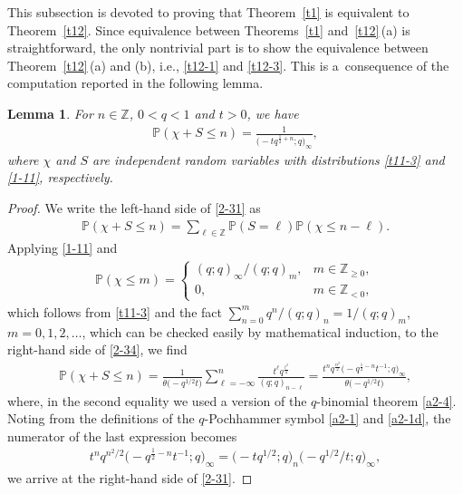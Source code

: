 \documentclass[pdftex]{sigma}
\numberwithin{equation}{section}
\newtheorem{Lemma}[Theorem]{Lemma}
\def\i{\infty}
\def\P{\mathbb{P}}
\def\Z{\mathbb{Z}}
\begin{document}
This subsection is devoted to proving that Theorem~\ref{t1} is equivalent to Theorem~\ref{t12}. Since equivalence between Theorems~\ref{t1} and~\ref{t12}\,(a) is straightforward, the only nontrivial part is to show the equivalence between Theorem~\ref{t12}\,(a) and (b), i.e., \eqref{t12-1} and \eqref{t12-3}. This is a~consequence of the computation reported in the following lemma.
\begin{Lemma}
\label{l27}
For $n\in\Z$, $0<q<1$ and
$t>0$, we have
 \begin{align}
\label{2-31}
 \P(\chi+S\le n)
 =
 \frac{1}{\bigl(-t q^{\frac12+n};q\bigr)_{\i}},
\end{align}
 where $\chi$ and $S$ are independent random variables with distributions
 \eqref{t11-3} and \eqref{1-11}, respectively.
\end{Lemma}
 \begin{proof}
 We write the left-hand side of \eqref{2-31} as
 \begin{align}
 \label{2-34}
 \P(\chi+S\le n)
 =
 \sum_{\ell\in\Z} \P(S=\ell)\P(\chi\le n-\ell).
 \end{align}
 Applying \eqref{1-11} and
 \begin{align*}
 \P(\chi\le m)=
 \begin{cases}
 (q;q)_{\i}/(q;q)_m,& m\in\Z_{\ge 0},
 \\
 0,& m\in\Z_{< 0},
 \end{cases}
 \end{align*}
 which follows from \eqref{t11-3} and the fact $\sum_{n=0}^mq^n/(q;q)_n=1/(q;q)_m$, $m=0,1,2,\dots$, which can be checked easily by mathematical induction, to the right-hand side of \eqref{2-34}, we find
 \begin{align*}
 \P(\chi+S\le n)
 =
 \frac{1}{\theta\bigl(-q^{1/2}t\bigr)}\sum_{\ell=-\infty}^n
 \frac{t^{\ell}q^{\frac{\ell^2}{2}}}
 {(q;q)_{n-\ell}}
 =
 \frac{t^nq^{\frac{n^2}{2}}\bigl(-q^{\frac12-n}t^{-1};q\bigr)_{\i}}{\theta\bigl(-q^{1/2}t\bigr)},
 \end{align*}
 where, in the second equality we used a version of the $q$-binomial theorem \eqref{a2-4}.
 Noting from the definitions of the $q$-Pochhammer symbol \eqref{a2-1} and \eqref{a2-1d}, the numerator of the last expression becomes
 \begin{align*}
 t^n q^{n^2/2} \bigl(-q^{\frac12-n}t^{-1};q\bigr)_\i
=\bigl(-t q^{1/2};q\bigr)_n \bigl(-q^{1/2}/t;q\bigr)_{\i},
 \end{align*}
 we arrive at the right-hand side of \eqref{2-31}.
 \end{proof}
\end{document}
